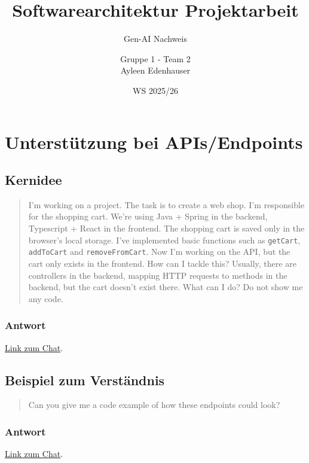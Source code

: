 \documentclass[12pt, a4paper]{scrreprt}
\title{Softwarearchitektur Projektarbeit}
\subtitle{Gen-AI Nachweis}
\author{Gruppe 1 - Team 2\\Ayleen Edenhauser}
\date{WS 2025/26}
\begin{document}
	\maketitle
	
	\tableofcontents
	
	\chapter{Unterstützung bei APIs/Endpoints}
	
	\section{Kernidee}
	
	\begin{quote}
		I'm working on a project. The task is to create a web shop. I'm responsible for the shopping cart. We're using Java + Spring in the backend, Typescript + React in the frontend. The shopping cart is saved only in the browser's local storage. I've implemented basic functions such as \texttt{getCart}, \texttt{addToCart} and \texttt{removeFromCart}. Now I'm working on the API, but the cart only exists in the frontend. How can I tackle this? Usually, there are controllers in the backend, mapping HTTP requests to methods in the backend, but the cart doesn't exist there. What can I do? Do not show me any code.
	\end{quote}
	
	\subsection{Antwort}
	
	\href{https://chatgpt.com/s/t_69499ce197148191a4f2e25cf796ae95}{Link zum Chat}.
	
	\section{Beispiel zum Verständnis}
	
	\begin{quote}
		Can you give me a code example of how these endpoints could look? 
	\end{quote}
	
	\subsection{Antwort}
	
	\href{https://chatgpt.com/s/t_69499ebbed94819190402b415677ac78}{Link zum Chat}.
	
\end{document}
